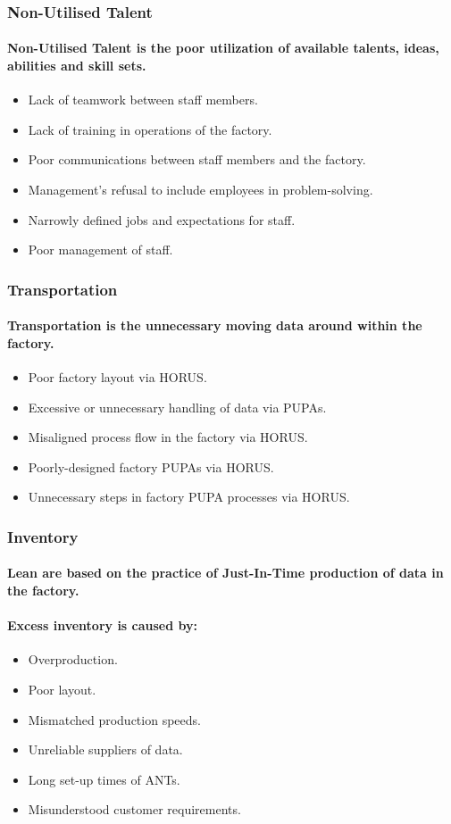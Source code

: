 \subsubsection{Non-Utilised Talent}
\paragraph{Non-Utilised Talent is the poor utilization of available talents, ideas, abilities and skill sets.}
\begin{itemize}
\item Lack of teamwork between staff members.
\item Lack of training in operations of the factory.
\item Poor communications between staff members and the factory.
\item Management's refusal to include employees in problem-solving.
\item Narrowly defined jobs and expectations for staff.
\item Poor management of staff.
\end{itemize}
\subsubsection{Transportation}
\paragraph{Transportation is the unnecessary moving data around within the factory.}
\begin{itemize}
\item Poor factory layout via HORUS.
\item Excessive or unnecessary handling of data via PUPAs.
\item Misaligned process flow in the factory via HORUS.
\item Poorly-designed factory PUPAs via HORUS.
\item Unnecessary steps in factory PUPA processes via HORUS.
\end{itemize}
\subsubsection{Inventory}
\paragraph{Lean are based on the practice of Just-In-Time production of data in the factory.}
\paragraph{Excess inventory is caused by:}
\begin{itemize}
\item Overproduction.
\item Poor layout.
\item Mismatched production speeds.
\item Unreliable suppliers of data.
\item Long set-up times of ANTs.
\item Misunderstood customer requirements.
\end{itemize}
